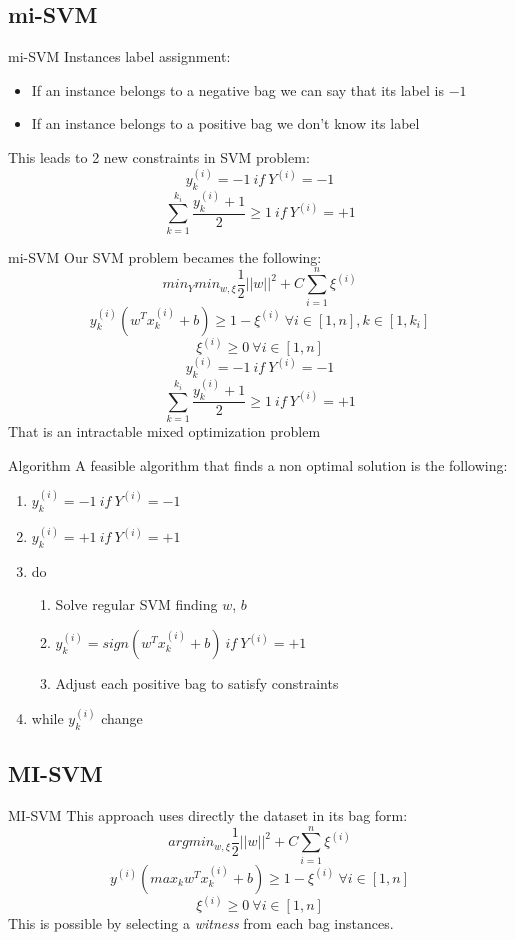 \subsection{mi-SVM}
\begin{frame}{mi-SVM}
	Instances label assignment:
	\begin{itemize}\setlength\itemsep{1em}
		\item If an instance belongs to a negative bag we can say that its label is $-1$
		\item If an instance belongs to a positive bag we don't know its label
	\end{itemize}
	This leads to 2 new constraints in SVM problem:
	$$y_k^{(i)} = -1 \ if \ Y^{(i)} = -1$$
	$$\sum_{k = 1}^{k_i}\frac{y_k^{(i)} + 1}{2} \geq 1 \ if \ Y^{(i)} = +1$$
\end{frame}

\begin{frame}{mi-SVM}
	Our SVM problem becames the following:
	$$min_Y min_{w, \xi} \frac{1}{2} ||w||^2 + C \sum_{i = 1}^{n}\xi^{(i)}$$
	$$y_k^{(i)} (w^T x_k^{(i)} + b) \geq 1 - \xi^{(i)} \ \forall i \in [1, n], k \in [1, k_i]$$
	$$\xi^{(i)} \geq 0 \ \forall i \in [1, n]$$
	$$y_k^{(i)} = -1 \ if \ Y^{(i)} = -1$$
	$$\sum_{k = 1}^{k_i}\frac{y_k^{(i)} + 1}{2} \geq 1 \ if \ Y^{(i)} = +1$$
	That is an intractable mixed optimization problem
\end{frame}

\begin{frame}{Algorithm}
	A feasible algorithm that finds a non optimal solution is the following:
	\begin{enumerate}
		\item $y_k^{(i)} = -1 \ if \ Y^{(i)} = -1$
		\item $y_k^{(i)} = +1 \ if \ Y^{(i)} = +1$
		\item do
		\begin{enumerate}
			\item Solve regular SVM finding $w$, $b$
			\item $y_k^{(i)} = sign(w^T x_k^{(i)} + b) \ if \ Y^{(i)} = +1$
			\item Adjust each positive bag to satisfy constraints
		\end{enumerate}
		\item while $y_k^{(i)}$ change
	\end{enumerate}
\end{frame}

\subsection{MI-SVM}
\begin{frame}{MI-SVM}
	This approach uses directly the dataset in its bag form:
	$$arg min_{w, \xi} \frac{1}{2} ||w||^2 + C \sum_{i = 1}^{n}\xi^{(i)}$$
	$$y^{(i)} (max_k w^T x_k^{(i)} + b) \geq 1 - \xi^{(i)} \ \forall i \in [1, n]$$
	$$\xi^{(i)} \geq 0 \ \forall i \in [1, n]$$
	This is possible by selecting a \textit{witness} from each bag instances.
\end{frame}

